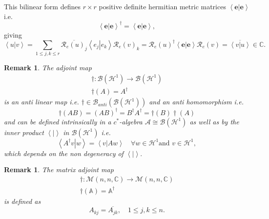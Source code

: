 \documentclass[aps,preprint]{revtex4}%
\newtheorem{remark}[theorem]{Remark}
\begin{document}
This bilinear form defines $r\times r$ positive definite hermitian metric
matrices $\left\langle \left.  \mathbf{e}\right\vert \mathbf{e}\right\rangle $
i.e.
\begin{equation}
\left\langle \left.  \mathbf{e}\right\vert \mathbf{e}\right\rangle ^{\dagger
}=\left\langle \left.  \mathbf{e}\right\vert \mathbf{e}\right\rangle ,
\end{equation}
giving
\begin{equation}
\left\langle \left.  u\right\vert v\right\rangle =\sum_{1\leq j,k\leq
r}\overline{\mathcal{R}_{e}\left(  u\right)  _{j}}\left\langle \left.
e_{j}\right\vert e_{k}\right\rangle \mathcal{R}_{e}\left(  v\right)
_{k}=\mathcal{R}_{e}\left(  u\right)  ^{\dagger}\left\langle \left.
\mathbf{e}\right\vert \mathbf{e}\right\rangle \mathcal{R}_{e}\left(  v\right)
=\overline{\left\langle \left.  v\right\vert u\right\rangle }\in\mathbb{C}.
\end{equation}


\begin{remark}
The adjoint map
\begin{gather}
\dagger:\mathcal{B}\left(  \mathcal{H}^{1}\right)  \rightarrow\mathcal{B}%
\left(  \mathcal{H}^{1}\right) \\
\dagger\left(  A\right)  =A^{\dagger}%
\end{gather}
is an anti linear map i.e. $\dagger\in\mathcal{B}_{anti}\left(  \mathcal{B}%
\left(  \mathcal{H}^{1}\right)  \right)  $ and an anti homomorphism i.e.
\begin{equation}
\dagger\left(  AB\right)  =\left(  AB\right)  ^{\dagger}=B^{\dagger}%
A^{\dagger}=\dagger\left(  B\right)  \dagger\left(  A\right)
\end{equation}
and can be defined intrinsically in a $c^{\ast}$-algebra $\mathcal{A\cong
B}\left(  \mathcal{H}^{1}\right)  $ as well as by the inner product
$\left\langle \left.  {}\right\vert \right\rangle $ in $\mathcal{B}\left(
\mathcal{H}^{1}\right)  $ i.e.
\begin{equation}
\left\langle \left.  A^{\dagger}v\right\vert w\right\rangle =\left\langle
\left.  v\right\vert Aw\right\rangle \quad\forall w\in\mathcal{H}^{1}\text{
and }v\in\mathcal{H}^{1},
\end{equation}
which \emph{depends} on the non degeneracy of $\left\langle \left.
{}\right\vert \right\rangle .$
\end{remark}

\begin{remark}
The \emph{matrix} adjoint map
\begin{gather}
\dagger:\mathcal{M}\left(  n,n,\mathbb{C}\right)  \rightarrow\mathcal{M}%
\left(  n,n,\mathbb{C}\right) \\
\dagger\left(  \mathbb{A}\right)  =\mathbb{A}^{\dagger}%
\end{gather}
is defined as
\begin{equation}
A_{kj}=\overline{A_{jk}},\quad1\leq j,k\leq n.
\end{equation}

\end{remark}
\end{document}
